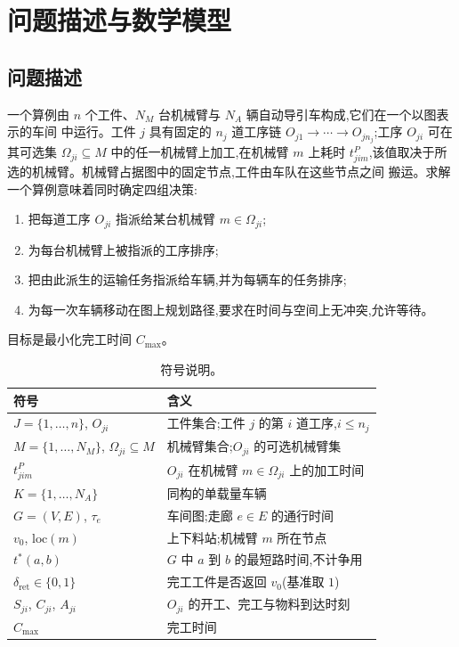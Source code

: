 \documentclass[manuscript,screen,review]{acmart}
\begin{document}
\section{问题描述与数学模型}
\label{sec:Chapter_III}
\subsection{问题描述}

一个算例由 $n$ 个工件、$N_M$ 台机械臂与 $N_A$ 辆自动导引车构成,它们在一个以图表示的车间
中运行。工件 $j$ 具有固定的 $n_j$ 道工序链 $O_{j1}\to\cdots\to O_{jn_j}$;工序 $O_{ji}$
可在其可选集 $\Omega_{ji}\subseteq M$ 中的任一机械臂上加工,在机械臂 $m$ 上耗时
$t^P_{jim}$,该值取决于所选的机械臂。机械臂占据图中的固定节点,工件由车队在这些节点之间
搬运。求解一个算例意味着同时确定四组决策:

\begin{enumerate}[label=(\roman*),leftmargin=*,topsep=2pt,itemsep=1pt]
\item 把每道工序 $O_{ji}$ 指派给某台机械臂 $m\in\Omega_{ji}$;
\item 为每台机械臂上被指派的工序排序;
\item 把由此派生的运输任务指派给车辆,并为每辆车的任务排序;
\item 为每一次车辆移动在图上规划路径,要求在时间与空间上无冲突,允许等待。
\end{enumerate}

目标是最小化完工时间 $C_{\max}$。

\begin{table}[t]
\caption{符号说明。}
\label{tab:notation}
\small
\begin{tabular}{@{}ll@{}}
\toprule
符号 & 含义 \\
\midrule
$J=\{1,\dots,n\}$, $O_{ji}$ & 工件集合;工件 $j$ 的第 $i$ 道工序,$i\le n_j$ \\
$M=\{1,\dots,N_M\}$, $\Omega_{ji}\subseteq M$ & 机械臂集合;$O_{ji}$ 的可选机械臂集 \\
$t^P_{jim}$ & $O_{ji}$ 在机械臂 $m\in\Omega_{ji}$ 上的加工时间 \\
$K=\{1,\dots,N_A\}$ & 同构的单载量车辆 \\
$G=(V,E)$, $\tau_e$ & 车间图;走廊 $e\in E$ 的通行时间 \\
$v_0$, $\mathrm{loc}(m)$ & 上下料站;机械臂 $m$ 所在节点 \\
$t^{*}(a,b)$ & $G$ 中 $a$ 到 $b$ 的最短路时间,不计争用 \\
$\delta_{\mathrm{ret}}\in\{0,1\}$ & 完工工件是否返回 $v_0$(基准取 $1$) \\
$S_{ji}$, $C_{ji}$, $A_{ji}$ & $O_{ji}$ 的开工、完工与物料到达时刻 \\
$C_{\max}$ & 完工时间 \\
\bottomrule
\end{tabular}
\end{table}
\end{document}
